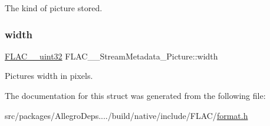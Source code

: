 The kind of picture stored. \mbox{\label{struct_f_l_a_c_____stream_metadata___picture_a18dc6cdef9fa6c815450671f631a1e04}} 
\subsubsection{\texorpdfstring{width}{width}}
{\footnotesize\ttfamily \hyperlink{ordinals_8h_a9c4005ea7ef8d564b0cc993cdd0e4e5e}{F\+L\+A\+C\+\_\+\+\_\+uint32} F\+L\+A\+C\+\_\+\+\_\+\+Stream\+Metadata\+\_\+\+Picture\+::width}

Picture\textquotesingle{}s width in pixels. 

The documentation for this struct was generated from the following file\+:\begin{DoxyCompactItemize}
\item 
src/packages/\+Allegro\+Deps..../build/native/include/\+F\+L\+A\+C/\hyperlink{format_8h}{format.\+h}\end{DoxyCompactItemize}
